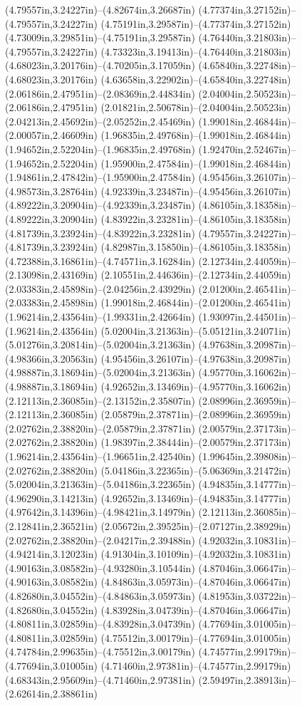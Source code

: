 (4.79557in,3.24227in)--(4.82674in,3.26687in) (4.77374in,3.27152in)--(4.79557in,3.24227in) (4.75191in,3.29587in)--(4.77374in,3.27152in) (4.73009in,3.29851in)--(4.75191in,3.29587in) (4.76440in,3.21803in)--(4.79557in,3.24227in) (4.73323in,3.19413in)--(4.76440in,3.21803in) (4.68023in,3.20176in)--(4.70205in,3.17059in) (4.65840in,3.22748in)--(4.68023in,3.20176in) (4.63658in,3.22902in)--(4.65840in,3.22748in) (2.06186in,2.47951in)--(2.08369in,2.44834in) (2.04004in,2.50523in)--(2.06186in,2.47951in) (2.01821in,2.50678in)--(2.04004in,2.50523in) (2.04213in,2.45692in)--(2.05252in,2.45469in) (1.99018in,2.46844in)--(2.00057in,2.46609in) (1.96835in,2.49768in)--(1.99018in,2.46844in) (1.94652in,2.52204in)--(1.96835in,2.49768in) (1.92470in,2.52467in)--(1.94652in,2.52204in) (1.95900in,2.47584in)--(1.99018in,2.46844in) (1.94861in,2.47842in)--(1.95900in,2.47584in) (4.95456in,3.26107in)--(4.98573in,3.28764in) (4.92339in,3.23487in)--(4.95456in,3.26107in) (4.89222in,3.20904in)--(4.92339in,3.23487in) (4.86105in,3.18358in)--(4.89222in,3.20904in) (4.83922in,3.23281in)--(4.86105in,3.18358in) (4.81739in,3.23924in)--(4.83922in,3.23281in) (4.79557in,3.24227in)--(4.81739in,3.23924in) (4.82987in,3.15850in)--(4.86105in,3.18358in) (4.72388in,3.16861in)--(4.74571in,3.16284in) (2.12734in,2.44059in)--(2.13098in,2.43169in) (2.10551in,2.44636in)--(2.12734in,2.44059in) (2.03383in,2.45898in)--(2.04256in,2.43929in) (2.01200in,2.46541in)--(2.03383in,2.45898in) (1.99018in,2.46844in)--(2.01200in,2.46541in) (1.96214in,2.43564in)--(1.99331in,2.42664in) (1.93097in,2.44501in)--(1.96214in,2.43564in) (5.02004in,3.21363in)--(5.05121in,3.24071in) (5.01276in,3.20814in)--(5.02004in,3.21363in) (4.97638in,3.20987in)--(4.98366in,3.20563in) (4.95456in,3.26107in)--(4.97638in,3.20987in) (4.98887in,3.18694in)--(5.02004in,3.21363in) (4.95770in,3.16062in)--(4.98887in,3.18694in) (4.92652in,3.13469in)--(4.95770in,3.16062in) (2.12113in,2.36085in)--(2.13152in,2.35807in) (2.08996in,2.36959in)--(2.12113in,2.36085in) (2.05879in,2.37871in)--(2.08996in,2.36959in) (2.02762in,2.38820in)--(2.05879in,2.37871in) (2.00579in,2.37173in)--(2.02762in,2.38820in) (1.98397in,2.38444in)--(2.00579in,2.37173in) (1.96214in,2.43564in)--(1.96651in,2.42540in) (1.99645in,2.39808in)--(2.02762in,2.38820in) (5.04186in,3.22365in)--(5.06369in,3.21472in) (5.02004in,3.21363in)--(5.04186in,3.22365in) (4.94835in,3.14777in)--(4.96290in,3.14213in) (4.92652in,3.13469in)--(4.94835in,3.14777in) (4.97642in,3.14396in)--(4.98421in,3.14979in) (2.12113in,2.36085in)--(2.12841in,2.36521in) (2.05672in,2.39525in)--(2.07127in,2.38929in) (2.02762in,2.38820in)--(2.04217in,2.39488in) (4.92032in,3.10831in)--(4.94214in,3.12023in) (4.91304in,3.10109in)--(4.92032in,3.10831in) (4.90163in,3.08582in)--(4.93280in,3.10544in) (4.87046in,3.06647in)--(4.90163in,3.08582in) (4.84863in,3.05973in)--(4.87046in,3.06647in) (4.82680in,3.04552in)--(4.84863in,3.05973in) (4.81953in,3.03722in)--(4.82680in,3.04552in) (4.83928in,3.04739in)--(4.87046in,3.06647in) (4.80811in,3.02859in)--(4.83928in,3.04739in) (4.77694in,3.01005in)--(4.80811in,3.02859in) (4.75512in,3.00179in)--(4.77694in,3.01005in) (4.74784in,2.99635in)--(4.75512in,3.00179in) (4.74577in,2.99179in)--(4.77694in,3.01005in) (4.71460in,2.97381in)--(4.74577in,2.99179in) (4.68343in,2.95609in)--(4.71460in,2.97381in) (2.59497in,2.38913in)--(2.62614in,2.38861in) 